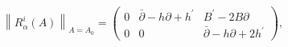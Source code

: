 \begin{equation}
\left\| R_{\alpha }^{i}(A)\right\| _{A=A_{0}}=\left( 
\begin{array}{ccc}
0 & \bar{\partial}-h\partial +h^{\prime } & B^{\prime }-2B\partial \\ 
0 & 0 & \bar{\partial}-h\partial +2h^{\prime }
\end{array}
\right) ,  \label{r}
\end{equation}

